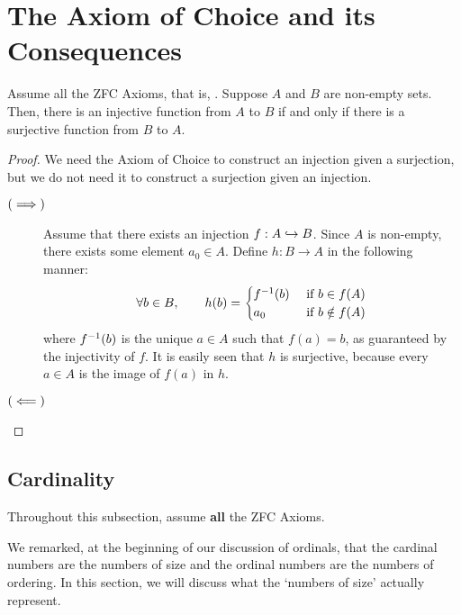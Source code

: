 \section{The Axiom of Choice and its Consequences}

\sorry

\begin{boxlemma}
    Assume all the ZFC Axioms, that is, \sorry. Suppose $A$ and $B$ are non-empty sets. Then, there is an injective function from $A$ to $B$ if and only if there is a surjective function from $B$ to $A$.
\end{boxlemma}
\begin{proof}
    We need the Axiom of Choice to construct an injection given a surjection, but we do not need it to construct a surjection given an injection.

    \begin{description}
        \item[$\left( \implies \right)$]
        Assume that there exists an injection $f : A \hookrightarrow B$. Since $A$ is non-empty, there exists some element $a_0 \in A$. Define $h : B \to A$ in the following manner:
        \begin{align*}
            \forall b \in B, \qquad
            h(b) =
            \begin{cases}
                f^{-1}(b) &\text{ if } b \in f(A) \\
                a_0 &\text{ if } b \notin f(A)
            \end{cases}
        \end{align*}
        where $f^{-1}(b)$ is the unique $a \in A$ such that $f(a) = b$, as guaranteed by the injectivity of $f$. It is easily seen that $h$ is surjective, because every $a \in A$ is the image of $f(a)$ in $h$.

        \item[$\left( \impliedby \right)$] \sorry
    \end{description}
\end{proof}

\subsection{Cardinality}

Throughout this subsection, assume \textbf{all} the ZFC Axioms.

We remarked, at the beginning of our discussion of ordinals, that the cardinal numbers are the numbers of size and the ordinal numbers are the numbers of ordering. In this section, we will discuss what the `numbers of size' actually represent.

